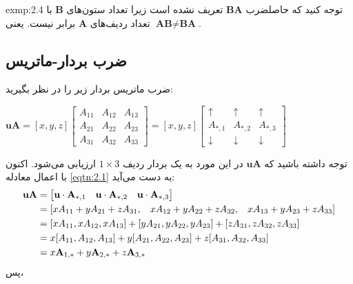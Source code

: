 {\begin{spacing}{1.5}
\begin{exmp}{exmp:2.4}
            توجه کنید که حاصلضرب $\textbf{BA}$ تعریف نشده است زیرا تعداد ستون‌های $\textbf{B}$ با تعداد ردیف‌های $\textbf{A}$ برابر نیست. یعنی $\textbf{AB}\neq\textbf{BA}$.
        \end{exmp}

    \end{spacing}
}

\subsection{\textbf{ضرب بردار-ماتریس}}
\label{subsec:2.2.2}
{
    \Large
    \begin{spacing}{1.5}
        ضرب ماتریس بردار زیر را در نظر بگیرید:

        \begin{center}
            $\textbf{uA}=[x,y,z]\begin{bmatrix}
                                    A_{11} & A_{12} & A_{13} \\
                                    A_{21} & A_{22} & A_{23} \\
                                    A_{31} & A_{32} & A_{33}
            \end{bmatrix}=[x,y,z]\begin{bmatrix}
                                     \uparrow   & \uparrow   & \uparrow   \\
                                     A_{*,1}    & A_{*,2}    & A_{*,3}    \\
                                     \downarrow & \downarrow & \downarrow
            \end{bmatrix}$
        \end{center}

        توجه داشته باشید که $\textbf{uA}$ در این مورد به یک بردار ردیف $1\times 3$ ارزیابی می‌شود.
        اکنون با اعمال معادله \ref{eqtn:2.1} به دست می‌آید:
        \begin{equation*}
            \centering
            \begin{split}
                \textbf{uA}&=\begin{bmatrix}
                                 \textbf{u}\cdot\textbf{A}_{*,1} & \textbf{u}\cdot\textbf{A}_{*,2} & \textbf{u}\cdot\textbf{A}_{*,3}
                \end{bmatrix}\\
                &=[xA_{11}+yA_{21}+zA_{31},\hspace{3 mm} xA_{12}+yA_{22}+zA_{32},\hspace{3 mm} xA_{13}+yA_{23}+zA_{33}] \\
                &=[xA_{11},xA_{12},xA_{13}]+[yA_{21},yA_{22},yA_{23}]+[zA_{31},zA_{32},zA_{33}] \\
                &=x[A_{11},A_{12},A_{13}]+y[A_{21},A_{22},A_{23}]+z[A_{31},A_{32},A_{33}] \\
                &=x\textbf{A}_{1,*}+y\textbf{A}_{2,*}+z\textbf{A}_{3,*}
            \end{split}
        \end{equation*}
        پس،


\end{spacing}}
